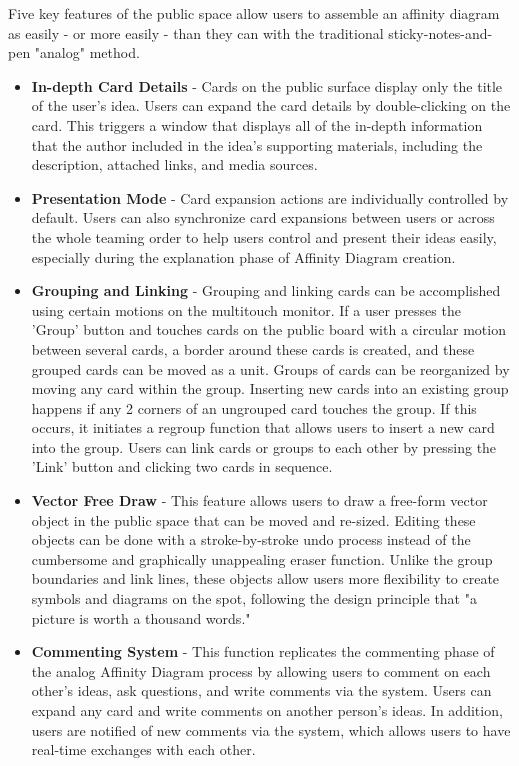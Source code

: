 \documentclass{sigchi}
\begin{document}
Five key features of the public space allow users to assemble an affinity diagram as easily - or more easily - than they can with the traditional sticky-notes-and-pen "analog" method.

\begin{itemize}


\item  \textbf{In-depth Card Details} - Cards on the public surface display only the title of the user's idea. Users can expand the card details by double-clicking on the card. This triggers a window that displays all of the in-depth information that the author included in the idea's supporting materials, including the description, attached links, and media sources. 
\item  \textbf{Presentation Mode} - Card expansion actions are individually controlled by default. Users can also synchronize card expansions between users or across the whole teaming order to help users control and present their ideas easily, especially during the explanation phase of Affinity Diagram creation.
\item \textbf{Grouping and Linking} -  Grouping and linking cards can be accomplished using certain motions on the multitouch monitor. If a user presses the 'Group' button and touches cards on the public board with a circular motion between several cards, a border around these cards is created, and these grouped cards can be moved as a unit. Groups of cards can be reorganized by moving any card within the group. Inserting new cards into an existing group happens if any 2 corners of an ungrouped card touches the group. If this occurs, it initiates a regroup function that allows users to insert a new card into the group. Users can link cards or groups to each other by pressing the 'Link' button and clicking two cards in sequence.  
\item \textbf{Vector Free Draw} - This feature allows users to draw a free-form vector object in the public space that can be moved and re-sized. Editing these objects can be done with a stroke-by-stroke undo process instead of the cumbersome and graphically unappealing eraser function. Unlike the group boundaries and link lines, these objects allow users more flexibility to create symbols and diagrams on the spot, following the design principle that "a picture is worth a thousand words."  
\item \textbf{Commenting System} - This function replicates the commenting phase of the analog Affinity Diagram process by allowing users to comment on each other's ideas, ask questions, and write comments via the system. Users can expand any card and write comments on another person's ideas. In addition, users are notified of new comments via the system, which allows users to have real-time exchanges with each other. 

\end{itemize}
\end{document}
